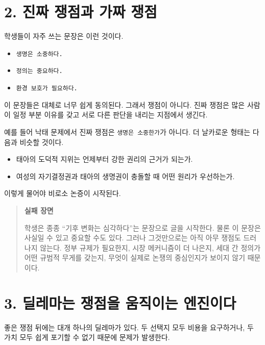 \section{2. 진짜 쟁점과 가짜 쟁점}\label{2-uxc9c4uxc9dc-uxc7c1uxc810uxacfc-uxac00uxc9dc-uxc7c1uxc810}

학생들이 자주 쓰는 문장은 이런 것이다.

\begin{itemize}
\tightlist
\item
  \texttt{생명은\ 소중하다.}
\item
  \texttt{정의는\ 중요하다.}
\item
  \texttt{환경\ 보호가\ 필요하다.}
\end{itemize}

이 문장들은 대체로 너무 쉽게 동의된다. 그래서 쟁점이 아니다. 진짜 쟁점은 많은 사람이 일정 부분 이유를 갖고 서로 다른 판단을 내리는 지점에서 생긴다.

예를 들어 낙태 문제에서 진짜 쟁점은 \texttt{생명은\ 소중한가}가 아니다. 더 날카로운 형태는 다음과 비슷할 것이다.

\begin{itemize}
\tightlist
\item
  태아의 도덕적 지위는 언제부터 강한 권리의 근거가 되는가.
\item
  여성의 자기결정권과 태아의 생명권이 충돌할 때 어떤 원리가 우선하는가.
\end{itemize}

이렇게 물어야 비로소 논증이 시작된다.

\begin{quote}
\textbf{실패 장면}

학생은 종종 ``기후 변화는 심각하다''는 문장으로 글을 시작한다. 물론 이 문장은 사실일 수 있고 중요할 수도 있다. 그러나 그것만으로는 아직 아무 쟁점도 드러나지 않는다. 정부 규제가 필요한지, 시장 메커니즘이 더 나은지, 세대 간 정의가 어떤 규범적 무게를 갖는지, 무엇이 실제로 논쟁의 중심인지가 보이지 않기 때문이다.
\end{quote}

\section{3. 딜레마는 쟁점을 움직이는 엔진이다}\label{3-uxb51cuxb808uxb9c8uxb294-uxc7c1uxc810uxc744-uxc6c0uxc9c1uxc774uxb294-uxc5d4uxc9c4uxc774uxb2e4}

좋은 쟁점 뒤에는 대개 하나의 딜레마가 있다. 두 선택지 모두 비용을 요구하거나, 두 가치 모두 쉽게 포기할 수 없기 때문에 문제가 발생한다.

